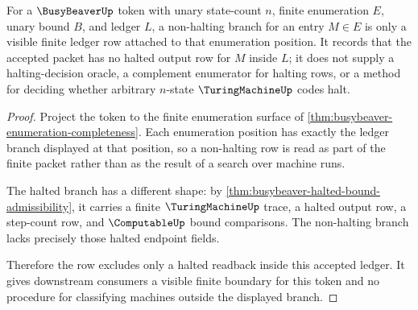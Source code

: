 \begin{theorem}
\label{thm:busybeaver-nonhalting-exclusion-obligation}
For a $\BusyBeaverUp$ token with unary state-count $n$, finite enumeration
$E$, unary bound $B$, and ledger $L$, a non-halting branch for an entry
$M \in E$ is only a visible finite ledger row attached to that enumeration
position. It records that the accepted packet has no halted output row for
$M$ inside $L$; it does not supply a halting-decision oracle, a complement
enumerator for halting rows, or a method for deciding whether arbitrary
$n$-state $\TuringMachineUp$ codes halt.
\end{theorem}
\begin{proof}
Project the token to the finite enumeration surface of
\autoref{thm:busybeaver-enumeration-completeness}. Each enumeration position
has exactly the ledger branch displayed at that position, so a non-halting row
is read as part of the finite packet rather than as the result of a search over
machine runs.

The halted branch has a different shape: by
\autoref{thm:busybeaver-halted-bound-admissibility}, it carries a finite
$\TuringMachineUp$ trace, a halted output row, a step-count row, and
$\ComputableUp$ bound comparisons. The non-halting branch lacks precisely
those halted endpoint fields.

Therefore the row excludes only a halted readback inside this accepted ledger.
It gives downstream consumers a visible finite boundary for this token and no
procedure for classifying machines outside the displayed branch.
\end{proof}

